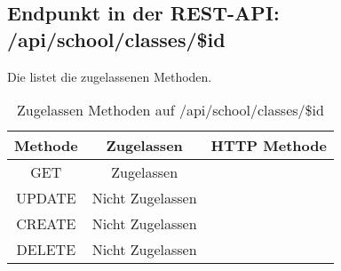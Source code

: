 \subsection{Endpunkt in der REST-API: /api/school/classes/\$id}
Die  listet die zugelassenen Methoden. 

\begin{table}[!htbp]
	\begin{tabular}{|c|c|c|}
		\hline
			\textbf{Methode} & \textbf{Zugelassen} & \textbf{HTTP Methode} \\ \hline
			GET & Zugelassen &  \\ \hline
			UPDATE & Nicht Zugelassen & \\ \hline 
			CREATE & Nicht Zugelassen & \\ \hline 
			DELETE & Nicht Zugelassen & \\ \hline
	\end{tabular}

		\caption{Zugelassen Methoden auf /api/school/classes/\$id}
		\label{tab:end:rest:api:school:classes:id:meth}
\end{table}